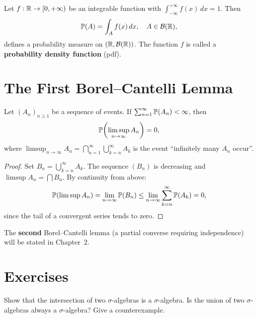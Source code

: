 \begin{proposition}
Let $f : \mathbb{R} \to [0, +\infty)$ be an integrable function with
$\int_{-\infty}^{+\infty} f(x)\, dx = 1$. Then
\[
    \mathbb{P}(A) = \int_A f(x)\, dx, \quad A \in \mathcal{B}(\mathbb{R}),
\]
defines a probability measure on $(\mathbb{R}, \mathcal{B}(\mathbb{R}))$. The function $f$ is
called a \textbf{probability density function} (pdf).
\end{proposition}

\section{The First Borel--Cantelli Lemma}

\begin{theorem}
\label{thm:borel_cantelli_1}
Let $(A_n)_{n \geq 1}$ be a sequence of events. If
$\sum_{n=1}^{\infty} \mathbb{P}(A_n) < \infty$, then
\[
    \mathbb{P}\!\left(\limsup_{n \to \infty} A_n\right) = 0,
\]
where $\displaystyle\limsup_{n \to \infty} A_n
= \bigcap_{n=1}^{\infty} \bigcup_{k=n}^{\infty} A_k$ is the event
``infinitely many $A_n$ occur''.
\end{theorem}

\begin{proof}
Set $B_n = \bigcup_{k=n}^{\infty} A_k$. The sequence $(B_n)$ is decreasing and
$\limsup A_n = \bigcap B_n$. By continuity from above:
\[
    \mathbb{P}(\limsup A_n) = \lim_{n \to \infty} \mathbb{P}(B_n)
    \leq \lim_{n \to \infty} \sum_{k=n}^{\infty} \mathbb{P}(A_k) = 0,
\]
since the tail of a convergent series tends to zero.
\end{proof}

\begin{remark}
The \textbf{second} Borel--Cantelli lemma (a partial converse requiring independence)
will be stated in Chapter~2.
\end{remark}

\section{Exercises}

\begin{exercise}
Show that the intersection of two $\sigma$-algebras is a $\sigma$-algebra.
Is the union of two $\sigma$-algebras always a $\sigma$-algebra? Give a
counterexample.
\end{exercise}

